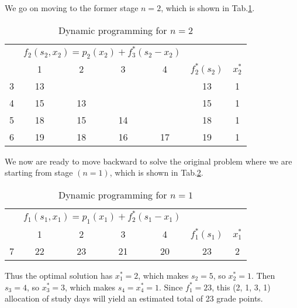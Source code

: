 \documentclass[a4paper]{article}
\begin{document}
\begin{enumerate}
\begin{solution}
  	We go on moving to the former stage $n=2$, which is shown in Tab.\ref{tabn2}.
  	\begin{table}[H]
	  	\centering
	  	\caption{Dynamic programming for $n=2$}
	  	\label{tabn2}
	  	\begin{tabular}{ccccccc}
	  		\toprule[1.5pt]
	  		&\multicolumn{4}{c}{$f_2(s_2,x_2)=p_2(x_2)+f_3^*(s_2-x_2)$}&\\
	  		\cmidrule{2-5}
	  		\diagbox[width=3em]{$s_2$}{$x_2$}&\hspace*{0.4cm}1\hspace*{0.4cm}&\hspace*{0.4cm}2\hspace*{0.4cm}&\hspace*{0.4cm}3\hspace*{0.4cm}&\hspace*{0.4cm}4\hspace*{0.3cm}&$f_2^*(s_2)$&$x_2^*$\\
	  		\midrule
			3&13&&&&13&1\\
			4&15&13&&&15&1\\
			5&18&15&14&&18&1\\
			6&19&18&16&17&19&1\\
	  		\bottomrule[1.5pt]
	  	\end{tabular}
  	\end{table}
  	We now are ready to move backward to solve the original problem where we are starting from stage $(n=1)$, which is shown in Tab.\ref{tabn1}.
  	\begin{table}[H]
	  	\centering
	  	\caption{Dynamic programming for $n=1$}
	  	\label{tabn1}
	  	\begin{tabular}{ccccccc}
	  		\toprule[1.5pt]
	  		~&\multicolumn{4}{c}{$f_1(s_1,x_1)=p_1(x_1)+f_2^*(s_1-x_1)$}&\\
	  		\cmidrule{2-5}
	  		\diagbox[width=3em]{$s_1$}{$x_1$}&\hspace*{0.4cm}1\hspace*{0.4cm}&\hspace*{0.4cm}2\hspace*{0.4cm}&\hspace*{0.4cm}3\hspace*{0.4cm}&\hspace*{0.4cm}4\hspace*{0.4cm}&$f_1^*(s_1)$&$x_1^*$\\
	  		\midrule
			7&22&23&21&20&23&2\\
	  		\bottomrule[1.5pt]
	  	\end{tabular}
  	\end{table}
  	Thus the optimal solution has $x_1^*=2$, which makes $s_2=5$, so $x_2^*=1$. Then $s_3=4$, so $x_3^*=3$, which makes $s_4=x_4^*=1$. Since $f_1^*=23$, this (2, 1, 3, 1) allocation of study days will yield an estimated total of 23 grade points.
\end{solution}


\end{enumerate}
\end{document}
